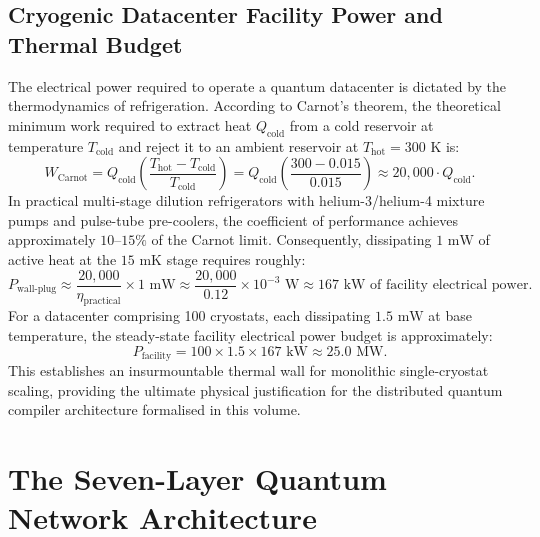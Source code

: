 \subsection{Cryogenic Datacenter Facility Power and Thermal Budget}
The electrical power required to operate a quantum datacenter is dictated by the thermodynamics of refrigeration. According to Carnot's theorem, the theoretical minimum work required to extract heat $Q_{\text{cold}}$ from a cold reservoir at temperature $T_{\text{cold}}$ and reject it to an ambient reservoir at $T_{\text{hot}} = 300\text{ K}$ is:
\begin{equation}
    W_{\text{Carnot}} = Q_{\text{cold}} \left( \frac{T_{\text{hot}} - T_{\text{cold}}}{T_{\text{cold}}} \right) = Q_{\text{cold}} \left( \frac{300 - 0.015}{0.015} \right) \approx 20{,}000 \cdot Q_{\text{cold}}.
    \label{eq:carnot_efficiency_datacenter}
\end{equation}
In practical multi-stage dilution refrigerators with helium-3/helium-4 mixture pumps and pulse-tube pre-coolers, the coefficient of performance achieves approximately $10\text{--}15\%$ of the Carnot limit. Consequently, dissipating $1\text{ mW}$ of active heat at the $15\text{ mK}$ stage requires roughly:
\begin{equation}
    P_{\text{wall-plug}} \approx \frac{20{,}000}{\eta_{\text{practical}}} \times 1\text{ mW} \approx \frac{20{,}000}{0.12} \times 10^{-3}\text{ W} \approx 167\text{ kW of facility electrical power}.
\end{equation}
For a datacenter comprising 100 cryostats, each dissipating $1.5\text{ mW}$ at base temperature, the steady-state facility electrical power budget is approximately:
\begin{equation}
    P_{\text{facility}} = 100 \times 1.5 \times 167\text{ kW} \approx 25.0\text{ MW}.
\end{equation}
This establishes an insurmountable thermal wall for monolithic single-cryostat scaling, providing the ultimate physical justification for the distributed quantum compiler architecture formalised in this volume.


\section{The Seven-Layer Quantum Network Architecture}
\label{sec:quantum_osi_stack}


